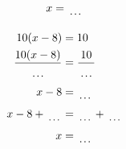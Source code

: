 \documentclass[12pt]{article}
\newcounter{minipagecount}
\begin{document}
\begin{multicols}{2}
\begin{minipage}[t]{0.45\textwidth}
\begin{align*}
        x &= \dotuline{\hspace{5mm}}\\
    \end{align*}
\end{minipage}\newpage
\noindent{(\theminipagecount)}\hspace{0.1mm} %
\begin{minipage}[t]{0.45\textwidth} %
    \vspace{-26pt}  %
    \raggedright %
    \begin{align*} %
        10(x - 8) &= 10\\
        \frac{10(x-8)}{\dotuline{\hspace{5mm}}} &= \frac{10}{\dotuline{\hspace{5mm}}}\\
        x - 8 &= \dotuline{\hspace{5mm}}\\
        x - 8 + \dotuline{\hspace{5mm}} &= \dotuline{\hspace{5mm}} + \dotuline{\hspace{5mm}}\\
        x &= \dotuline{\hspace{5mm}}\\
    \end{align*}
\end{minipage} %
\noindent{(\theminipagecount)}\hspace{0.1mm} %
\begin{minipage}[t]{0.45\textwidth} %
    \vspace{-26pt}  %

\end{minipage}
\end{multicols}
\end{document}
